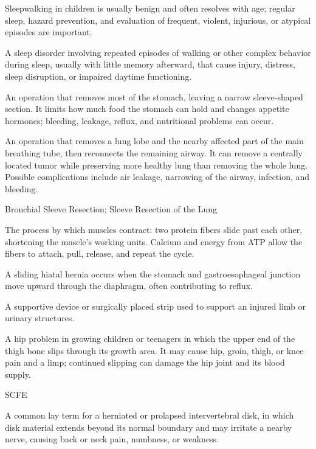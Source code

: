  Sleepwalking in children is usually benign and often resolves with age; regular sleep, hazard prevention, and evaluation of frequent, violent, injurious, or atypical episodes are important.

 A sleep disorder involving repeated episodes of walking or other complex behavior during sleep, usually with little memory afterward, that cause injury, distress, sleep disruption, or impaired daytime functioning.

 An operation that removes most of the stomach, leaving a narrow sleeve-shaped section. It limits how much food the stomach can hold and changes appetite hormones; bleeding, leakage, reflux, and nutritional problems can occur.

 An operation that removes a lung lobe and the nearby affected part of the main breathing tube, then reconnects the remaining airway. It can remove a centrally located tumor while preserving more healthy lung than removing the whole lung. Possible complications include air leakage, narrowing of the airway, infection, and bleeding.

\synonyms
Bronchial Sleeve Resection; Sleeve Resection of the Lung

 The process by which muscles contract: two protein fibers slide past each other, shortening the muscle’s working units. Calcium and energy from ATP allow the fibers to attach, pull, release, and repeat the cycle.

 A sliding hiatal hernia occurs when the stomach and gastroesophageal junction move upward through the diaphragm, often contributing to reflux.

 A supportive device or surgically placed strip used to support an injured limb or urinary structures.

 A hip problem in growing children or teenagers in which the upper end of the thigh bone slips through its growth area. It may cause hip, groin, thigh, or knee pain and a limp; continued slipping can damage the hip joint and its blood supply.

\synonyms
SCFE

 A common lay term for a herniated or prolapsed intervertebral disk, in which disk material extends beyond its normal boundary and may irritate a nearby nerve, causing back or neck pain, numbness, or weakness.

